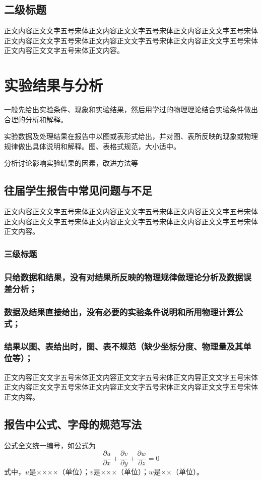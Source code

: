 \documentclass{thuemp}
\begin{document}
\subsection{二级标题}
正文内容正文文字五号宋体正文内容正文文字五号宋体正文内容正文文字五号宋体正文内容正文文字五号宋体正文内容正文文字五号宋体正文内容正文文字五号宋体正文内容正文文字五号宋体正文内容。

\section{实验结果与分析}
一般先给出实验条件、现象和实验结果，然后用学过的物理理论结合实验条件做出合理的分析和解释。

实验数据及处理结果在报告中以图或表形式给出，并对图、表所反映的现象或物理规律做出具体说明和解释。图、表格式规范，大小适中。

分析讨论影响实验结果的因素，改进方法等

\subsection{往届学生报告中常见问题与不足}
正文内容正文文字五号宋体正文内容正文文字五号宋体正文内容正文文字五号宋体正文内容正文文字五号宋体正文内容正文文字五号宋体正文内容正文文字五号宋体正文内容。
\subsubsection{三级标题}
\subsubsection{只给数据和结果，没有对结果所反映的物理规律做理论分析及数据误差分析；}
\subsubsection{数据及结果直接给出，没有必要的实验条件说明和所用物理计算公式；}
\subsubsection{结果以图、表给出时，图、表不规范（缺少坐标分度、物理量及其单位等）；}
正文内容正文文字五号宋体正文内容正文文字五号宋体正文内容正文文字五号宋体正文内容正文文字五号宋体正文内容正文文字五号宋体正文内容正文文字五号宋体正文内容。
\subsection{报告中公式、字母的规范写法}
公式全文统一编号，如公式为
\begin{equation}\label{EQ1}
\frac{\partial u}{\partial x}+\frac{\partial v}{\partial y}+\frac{\partial w}{\partial z}=0
\end{equation}
式中，$u$是××××（单位）；$v$是×××（单位）；$w$是××（单位）。
\end{document}

